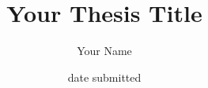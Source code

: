 \documentclass[a4paper]{memoir}
\title{Your Thesis Title}
\author{Your Name}
\date{date submitted}
\begin{document}
\frontmatter
\maketitle

\pagebreak

\pagebreak 

\tableofcontents
\label{contents}

\pagebreak

\mainmatter

\end{document}

